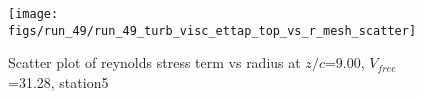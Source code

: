 \begin{figure}[H]
\centering
\texttt{[image: figs/run\_49/run\_49\_turb\_visc\_ettap\_top\_vs\_r\_mesh\_scatter]}
\caption{Scatter plot of reynolds stress term vs radius at $z/c$=9.00, $V_{free}$=31.28, station5}
\label{fig:run_49_turb_visc_ettap_top_vs_r_mesh_scatter}
\end{figure}



